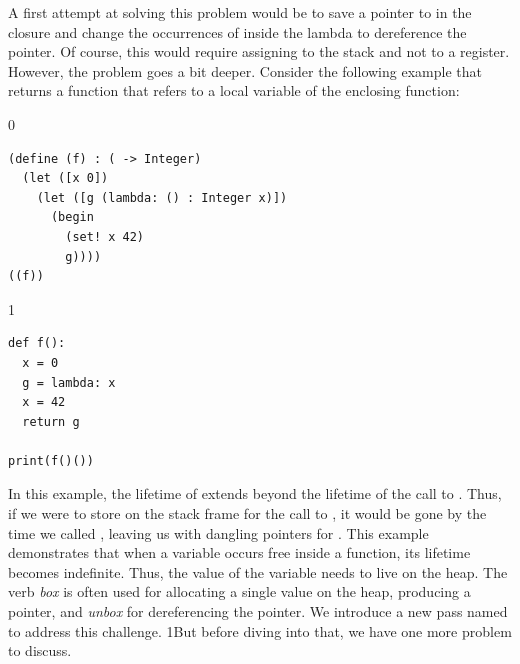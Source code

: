 \documentclass[7x10]{TimesAPriori_MIT}%
\def\racketEd{0}
\def\pythonEd{1}
\def\edition{1}
\newcommand{\pythonColor}[0]{}
\newcommand{\python}[1]{{\if\edition\pythonEd\pythonColor #1\fi}}
\numberwithin{theorem}{chapter}
\numberwithin{definition}{chapter}
\numberwithin{equation}{chapter}
\begin{document}
A first attempt at solving this problem would be to save a pointer to
 in the closure and change the occurrences of  inside
the lambda to dereference the pointer. Of course, this would require
assigning  to the stack and not to a register. However, the
problem goes a bit deeper.
Consider the following example that returns a function that refers to
a local variable of the enclosing function:
\begin{center}
\begin{minipage}{\textwidth}
{\if\edition\racketEd
\begin{lstlisting}
(define (f) : ( -> Integer)
  (let ([x 0])
    (let ([g (lambda: () : Integer x)])
      (begin
        (set! x 42)
        g))))
((f))
\end{lstlisting}
\fi}
{\if\edition\pythonEd\pythonColor
\begin{lstlisting}
def f():
  x = 0
  g = lambda: x
  x = 42
  return g

print(f()())
\end{lstlisting}
\fi}
\end{minipage}
\end{center}
In this example, the lifetime of  extends beyond the lifetime
of the call to . Thus, if we were to store  on the
stack frame for the call to , it would be gone by the time we
called , leaving us with dangling pointers for
. This example demonstrates that when a variable occurs free
inside a function, its lifetime becomes indefinite. Thus, the value of
the variable needs to live on the heap.  The verb
\emph{box} is often used for allocating a single
value on the heap, producing a pointer, and
\emph{unbox} for dereferencing the pointer.
%
We introduce a new pass named  to address
this challenge.
%
\python{But before diving into that, we have one more
  problem to discuss.}
\end{document}
